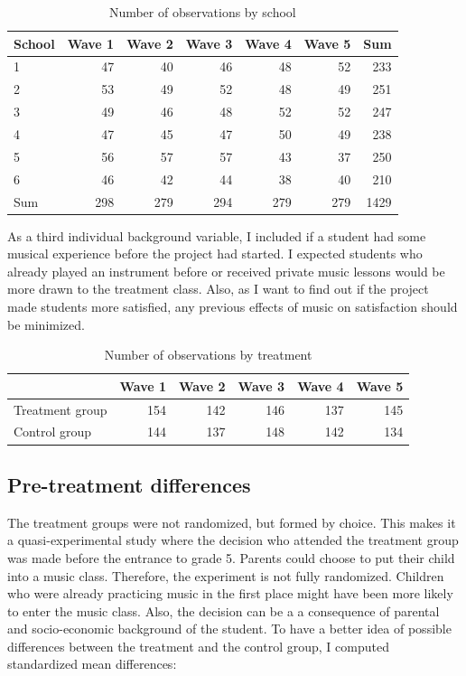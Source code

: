 \documentclass[a4, 12pt]{article}
\begin{document}
\begin{table}[H]

\caption{\label{tab:N-Obs-per-wave-school}Number of observations by school}
\centering
\begin{tabular}[t]{lrrrrrr}
\toprule
School & Wave 1 & Wave 2 & Wave 3 & Wave 4 & Wave 5 & Sum\\
\midrule
1 & 47 & 40 & 46 & 48 & 52 & 233\\
2 & 53 & 49 & 52 & 48 & 49 & 251\\
3 & 49 & 46 & 48 & 52 & 52 & 247\\
4 & 47 & 45 & 47 & 50 & 49 & 238\\
5 & 56 & 57 & 57 & 43 & 37 & 250\\
6 & 46 & 42 & 44 & 38 & 40 & 210\\
Sum & 298 & 279 & 294 & 279 & 279 & 1429\\
\bottomrule
\end{tabular}
\end{table}

As a third individual background variable, I included if a student had some musical experience before the project had started. I expected students who already played an instrument before or received private music lessons would be more drawn to the treatment class. Also, as I want to find out if the project made students more satisfied, any previous effects of music on satisfaction should be minimized.

\begin{table}[H]

\caption{\label{tab:N-Obs}Number of observations by treatment}
\centering
\begin{tabular}[t]{lrrrrr}
\toprule
  & Wave 1 & Wave 2 & Wave 3 & Wave 4 & Wave 5\\
\midrule
Treatment group & 154 & 142 & 146 & 137 & 145\\
Control group & 144 & 137 & 148 & 142 & 134\\
\bottomrule
\end{tabular}
\end{table}

\hypertarget{pre-treatment-differences}{%
\subsection{Pre-treatment differences}\label{pre-treatment-differences}}

\label{sec:pre-treat-diff}
The treatment groups were not randomized, but formed by choice. This makes it a quasi-experimental study where the decision who attended the treatment group was made before the entrance to grade 5. Parents could choose to put their child into a music class. Therefore, the experiment is not fully randomized. Children who were already practicing music in the first place might have been more likely to enter the music class. Also, the decision can be a a consequence of parental and socio-economic background of the student. To have a better idea of possible differences between the treatment and the control group, I computed standardized mean differences:
\end{document}

